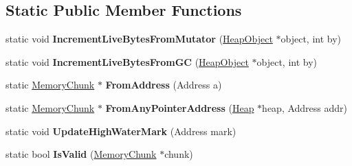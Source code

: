 \subsection*{Static Public Member Functions}
\begin{DoxyCompactItemize}
\item 
static void {\bfseries Increment\+Live\+Bytes\+From\+Mutator} (\hyperlink{classv8_1_1internal_1_1_heap_object}{Heap\+Object} $\ast$object, int by)\hypertarget{classv8_1_1internal_1_1_memory_chunk_ae8095fca66d50f1c2190b95dc805deec}{}\label{classv8_1_1internal_1_1_memory_chunk_ae8095fca66d50f1c2190b95dc805deec}

\item 
static void {\bfseries Increment\+Live\+Bytes\+From\+GC} (\hyperlink{classv8_1_1internal_1_1_heap_object}{Heap\+Object} $\ast$object, int by)\hypertarget{classv8_1_1internal_1_1_memory_chunk_a31c80e624431bc6fd530a82ca6eebf80}{}\label{classv8_1_1internal_1_1_memory_chunk_a31c80e624431bc6fd530a82ca6eebf80}

\item 
static \hyperlink{classv8_1_1internal_1_1_memory_chunk}{Memory\+Chunk} $\ast$ {\bfseries From\+Address} (Address a)\hypertarget{classv8_1_1internal_1_1_memory_chunk_aa085e1ca88c6b66f52e3f12dc4c89195}{}\label{classv8_1_1internal_1_1_memory_chunk_aa085e1ca88c6b66f52e3f12dc4c89195}

\item 
static \hyperlink{classv8_1_1internal_1_1_memory_chunk}{Memory\+Chunk} $\ast$ {\bfseries From\+Any\+Pointer\+Address} (\hyperlink{classv8_1_1internal_1_1_heap}{Heap} $\ast$heap, Address addr)\hypertarget{classv8_1_1internal_1_1_memory_chunk_aaeeba00d4bdae95dc0fa7c4200924e69}{}\label{classv8_1_1internal_1_1_memory_chunk_aaeeba00d4bdae95dc0fa7c4200924e69}

\item 
static void {\bfseries Update\+High\+Water\+Mark} (Address mark)\hypertarget{classv8_1_1internal_1_1_memory_chunk_aa477c12d9fb6017aa4378416ad7802b8}{}\label{classv8_1_1internal_1_1_memory_chunk_aa477c12d9fb6017aa4378416ad7802b8}

\item 
static bool {\bfseries Is\+Valid} (\hyperlink{classv8_1_1internal_1_1_memory_chunk}{Memory\+Chunk} $\ast$chunk)\hypertarget{classv8_1_1internal_1_1_memory_chunk_ab8999596960d7e2e8e9a2726417b35e3}{}\label{classv8_1_1internal_1_1_memory_chunk_ab8999596960d7e2e8e9a2726417b35e3}

\end{DoxyCompactItemize}
